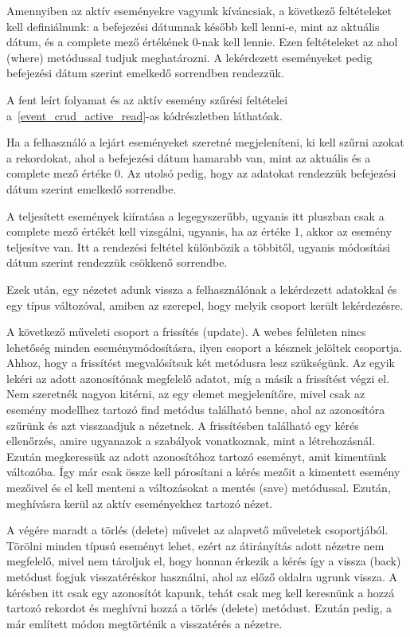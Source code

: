 \documentclass[
]{thesis-ekf}
\theoremstyle{definition}
\theoremstyle{remark}
\begin{document}
	
	Amennyiben az aktív eseményekre vagyunk kíváncsiak, a következő feltételeket kell definiálnunk: a befejezési dátumnak később kell lenni-e, mint az aktuális dátum, és a complete mező értékének 0-nak kell lennie. Ezen feltételeket az ahol (where) metódussal tudjuk meghatározni. A lekérdezett eseményeket pedig befejezési dátum szerint emelkedő sorrendben rendezzük.
	
	A fent leírt folyamat és az aktív esemény szűrési feltételei a~\ref{event_crud_active_read}-as kódrészletben láthatóak.
	
	
	
	Ha a felhasználó a lejárt eseményeket szeretné megjeleníteni, ki kell szűrni azokat a rekordokat, ahol a befejezési dátum hamarabb van, mint az aktuális és a complete mező értéke 0. Az utolsó pedig, hogy az adatokat rendezzük befejezési dátum szerint emelkedő sorrendbe.
	
	A teljesített események kiíratása a legegyszerűbb, ugyanis itt pluszban csak a complete mező értékét kell vizsgálni, ugyanis, ha az értéke 1, akkor az esemény teljesítve van. Itt a rendezési feltétel különbözik a többitől, ugyanis módosítási dátum szerint rendezzük csökkenő sorrendbe.
	
	Ezek után, egy nézetet adunk vissza a felhasználónak a lekérdezett adatokkal és egy típus változóval, amiben az szerepel, hogy melyik csoport került lekérdezésre.
	
	A következő műveleti csoport a frissítés (update). A webes felületen nincs lehetőség minden eseménymódosításra, ilyen csoport a késznek jelöltek csoportja. Ahhoz, hogy a frissítést megvalósítsuk két metódusra lesz szükségünk. Az egyik lekéri az adott azonosítónak megfelelő adatot, míg a másik a frissítést végzi el. Nem szeretnék nagyon kitérni, az egy elemet megjelenítőre, mivel csak az esemény modellhez tartozó find metódus található benne, ahol az azonosítóra szűrünk és azt visszaadjuk a nézetnek. A frissítésben található egy kérés ellenőrzés, amire ugyanazok a szabályok vonatkoznak, mint a létrehozásnál. Ezután megkeressük az adott azonosítóhoz tartozó eseményt, amit kimentünk változóba. Így már csak össze kell párosítani a kérés mezőit a kimentett esemény mezőivel és el kell menteni a változásokat a mentés (save) metódussal. Ezután, meghívásra kerül az aktív eseményekhez tartozó nézet. 
	
	A végére maradt a törlés (delete) művelet az alapvető műveletek csoportjából. Törölni minden típusú eseményt lehet, ezért az átirányítás adott nézetre nem megfelelő, mivel nem tároljuk el, hogy honnan érkezik a kérés így a vissza (back) metódust fogjuk visszatéréskor használni, ahol az előző oldalra ugrunk vissza. A kérésben itt csak egy azonosítót kapunk, tehát csak meg kell keresnünk a hozzá tartozó rekordot és meghívni hozzá a törlés (delete) metódust. Ezután pedig, a már említett módon megtörténik a
	visszatérés a nézetre. 
	
\end{document}
